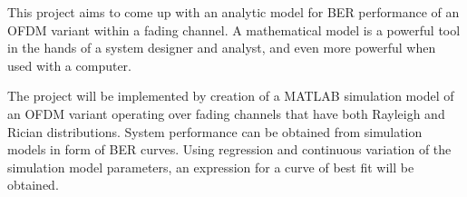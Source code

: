 This project aims to come up with an analytic model for \gls{BER} performance of an \gls{OFDM} variant within a fading channel. A mathematical model is a powerful tool in the hands of a system designer and analyst, and even more powerful when used with a computer.


The project will be implemented by creation of a MATLAB simulation model of an \gls{OFDM} variant operating over fading channels that have both Rayleigh and Rician distributions. System performance can be obtained from simulation models in form of \gls{BER} curves. Using regression and continuous variation of the simulation model parameters, an expression for a curve of best fit will be obtained.

